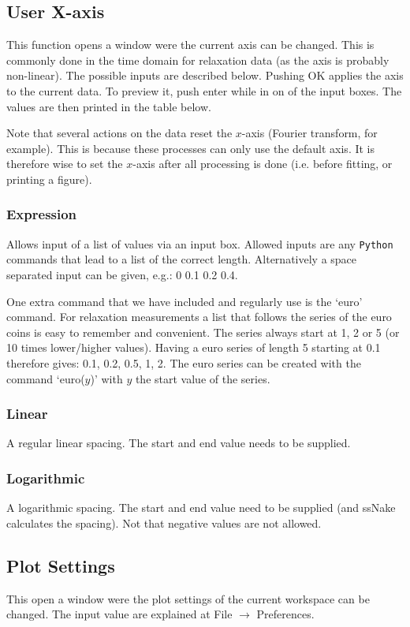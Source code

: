 \documentclass[11pt,a4paper]{article}
\begin{document}
\subsection{User X-axis}
This function opens a window were the current axis can be changed. This is commonly done in the time domain
for relaxation data (as the axis is probably non-linear). The possible inputs are described below. Pushing OK
applies the axis to the current data. To preview it, push enter while in on of the input boxes. The values are
then printed in the table below.

Note that several actions on the data reset the $x$-axis (Fourier transform, for example). This is because
these processes can only use the default axis. It is therefore wise to set the $x$-axis after all processing is
done (i.e. before fitting, or printing a figure).

\subsubsection{Expression}
Allows input of a list of values via an input box. Allowed inputs are any \texttt{Python} commands that lead
to a list of the correct length. Alternatively a space separated input can be given, e.g.: 0 0.1 0.2 0.4.

One extra command that we have included and regularly use is the `euro' command. For relaxation measurements a
list that follows the series of the euro coins is easy to remember and convenient. The series always start at
1, 2 or 5 (or 10 times lower/higher values). Having a euro series of length 5 starting at 0.1 therefore gives:
0.1, 0.2, 0.5, 1, 2. The euro series can be created with the command `euro($y$)' with $y$ the start value of
the series.



\subsubsection{Linear}
A regular linear spacing. The start and end value needs to be supplied.

\subsubsection{Logarithmic}
A logarithmic spacing. The start and end value need to be supplied (and ssNake calculates the spacing). Not
that negative values are not allowed.

\subsection{Plot Settings}
This open a window were the plot settings of the current workspace can be changed. The input value are explained
at File $\rightarrow$ Preferences.
\end{document}
